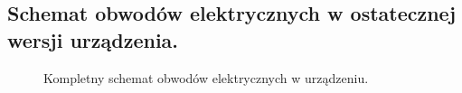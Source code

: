 \documentclass[a4paper,oneside,11pt]{report}
\begin{document}
\subsection{Schemat obwodów elektrycznych w ostatecznej wersji urządzenia.}
\begin{figure}[htp] 
\caption{Kompletny schemat obwodów elektrycznych w urządzeniu.}
\end{figure}
\newpage
\end{document}
